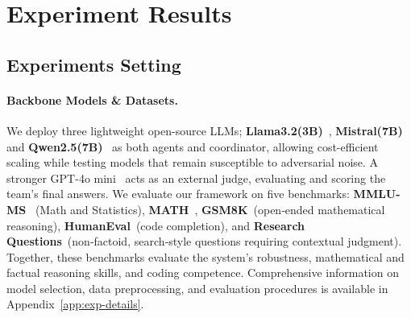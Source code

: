 \section{Experiment Results}\label{sec:experiments}


\subsection{Experiments Setting}

\paragraph{Backbone Models \& Datasets.} 
We deploy three lightweight open-source LLMs; \textbf{Llama3.2(3B)}~\cite{llama3.2}, \textbf{Mistral(7B)}~\cite{mistral7b} and \textbf{Qwen2.5(7B)}~\cite{qwen2.5} as both agents and coordinator, allowing cost-efficient scaling while testing models that remain susceptible to adversarial noise. A stronger GPT-4o mini~\cite{gpt4o-mini} acts as an external judge, evaluating and scoring the team's final answers. We evaluate our framework on five benchmarks: \textbf{ MMLU-MS}~\cite{MMLU} (Math and Statistics), \textbf{MATH}~\cite{math}, \textbf{GSM8K}~\cite{gsm8k}(open‑ended mathematical reasoning), \textbf{HumanEval}~\cite{humaneval}(code completion), and \textbf{Research Questions}~\cite{researchQA}(non‑factoid, search‑style questions requiring contextual judgment). Together, these benchmarks evaluate the system’s robustness, mathematical and factual reasoning skills, and coding competence. Comprehensive information on model selection, data preprocessing, and evaluation procedures is available in Appendix~\ref{app:exp-details}.



